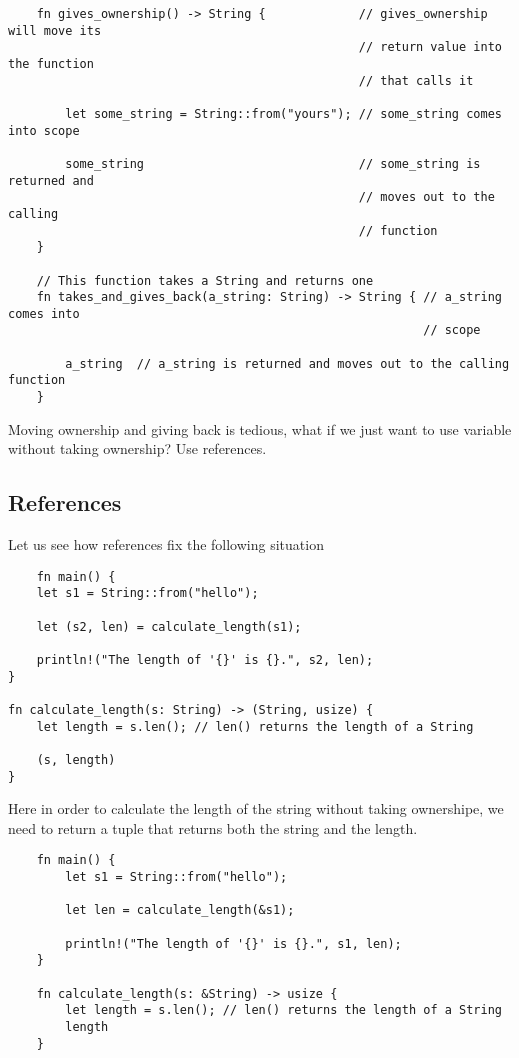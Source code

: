 \begin{example}
\begin{example}
\begin{lstlisting}
    fn gives_ownership() -> String {             // gives_ownership will move its
                                                 // return value into the function
                                                 // that calls it
    
        let some_string = String::from("yours"); // some_string comes into scope
    
        some_string                              // some_string is returned and
                                                 // moves out to the calling
                                                 // function
    }
    
    // This function takes a String and returns one
    fn takes_and_gives_back(a_string: String) -> String { // a_string comes into
                                                          // scope
    
        a_string  // a_string is returned and moves out to the calling function
    }
    \end{lstlisting}
    

\end{example}

Moving ownership and giving back is tedious, what if we just want to use variable without taking ownership? Use references.

\end{example}
\subsection{References}

Let us see how references fix the following situation\begin{lstlisting}
    fn main() {
    let s1 = String::from("hello");

    let (s2, len) = calculate_length(s1);

    println!("The length of '{}' is {}.", s2, len);
}

fn calculate_length(s: String) -> (String, usize) {
    let length = s.len(); // len() returns the length of a String

    (s, length)
}
\end{lstlisting}

Here in order to calculate the length of the string without taking ownershipe, we need to return a tuple that returns both the string and the length.

\begin{lstlisting}
    fn main() {
        let s1 = String::from("hello");
    
        let len = calculate_length(&s1);
    
        println!("The length of '{}' is {}.", s1, len);
    }
    
    fn calculate_length(s: &String) -> usize {
        let length = s.len(); // len() returns the length of a String
        length 
    }
\end{lstlisting}

